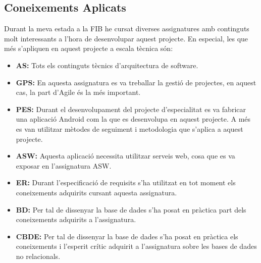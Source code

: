 \subsection{Coneixements Aplicats}
Durant la meva estada a la FIB he cursat diverses assignatures amb continguts molt interessants a l'hora de desenvolupar aquest projecte. En especial, les que més s'apliquen en aquest projecte a escala tècnica són:
\begin{itemize}
\item{}\textbf{AS:} Tots els continguts tècnics d'arquitectura de software.
\item{}\textbf{GPS:} En aquesta assignatura es va treballar la gestió de projectes, en aquest cas, la part d'Agile és la més important.
\item{}\textbf{PES:} Durant el desenvolupament del projecte d'especialitat es va fabricar una aplicació Android com la que es desenvolupa en aquest projecte. A més es van utilitzar mètodes de seguiment i metodologia que s'aplica a aquest projecte.
\item{}\textbf{ASW:} Aquesta aplicació necessita utilitzar serveis web, cosa que es va exposar en l'assignatura ASW.
\item{}\textbf{ER:} Durant l'especificació de requisits s'ha utilitzat en tot moment els coneixements adquirits cursant aquesta assignatura.
\item{}\textbf{BD:} Per tal de dissenyar la base de dades s'ha posat en pràctica part dels coneixements adquirits a l'assignatura.
\item{}\textbf{CBDE:} Per tal de dissenyar la base de dades s'ha posat en pràctica els coneixements i l'esperit crític adquirit a l'assignatura sobre les bases de dades no relacionals.

\end{itemize}